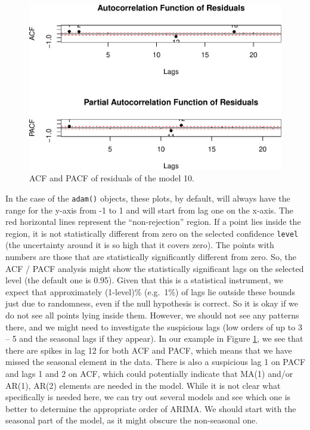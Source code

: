 \documentclass[
]{book}
\theoremstyle{definition}
\theoremstyle{definition}
\theoremstyle{definition}
\theoremstyle{definition}
\theoremstyle{remark}
\begin{document}
\begin{figure}
\centering
\includegraphics{Svetunkov--2022----ADAM_files/figure-latex/adamModelSeat10ACFPACF-1.pdf}
\caption{\label{fig:adamModelSeat10ACFPACF}ACF and PACF of residuals of the model 10.}
\end{figure}

In the case of the \texttt{adam()} objects, these plots, by default, will always have the range for the y-axis from -1 to 1 and will start from lag one on the x-axis. The red horizontal lines represent the ``non-rejection'' region. If a point lies inside the region, it is not statistically different from zero on the selected confidence \texttt{level} (the uncertainty around it is so high that it covers zero). The points with numbers are those that are statistically significantly different from zero. So, the ACF / PACF analysis might show the statistically significant lags on the selected level (the default one is 0.95). Given that this is a statistical instrument, we expect that approximately (1-level)\% (e.g.~1\%) of lags lie outside these bounds just due to randomness, even if the null hypothesis is correct. So it is okay if we do not see all points lying inside them. However, we should not see any patterns there, and we might need to investigate the suspicious lags (low orders of up to 3 -- 5 and the seasonal lags if they appear). In our example in Figure \ref{fig:adamModelSeat10ACFPACF}, we see that there are spikes in lag 12 for both ACF and PACF, which means that we have missed the seasonal element in the data. There is also a suspicious lag 1 on PACF and lags 1 and 2 on ACF, which could potentially indicate that MA(1) and/or AR(1), AR(2) elements are needed in the model. While it is not clear what specifically is needed here, we can try out several models and see which one is better to determine the appropriate order of ARIMA. We should start with the seasonal part of the model, as it might obscure the non-seasonal one.
\end{document}
